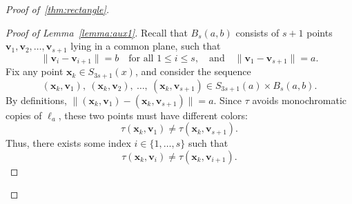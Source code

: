\documentclass[11pt]{article}
\theoremstyle{definition}
\begin{document}
\begin{proof}[Proof of~\cref{thm:rectangle}]
\begin{proof}[Proof of Lemma~\ref{lemma:aux1}]
Recall that \( B_s(a, b) \) consists of \(s + 1\) points \(\boldsymbol{v}_1, \boldsymbol{v}_2, \ldots, \boldsymbol{v}_{s+1}\) lying in a common plane, such that
    \[
        \|\boldsymbol{v}_i - \boldsymbol{v}_{i+1}\| = b \quad \text{for all } 1 \le i \le s, \quad \text{and} \quad \|\boldsymbol{v}_1 - \boldsymbol{v}_{s+1}\| = a.
    \]
Fix any point \(\boldsymbol{x}_k \in S_{3s+1}(x)\), and consider the sequence
\[
(\boldsymbol{x}_k, \boldsymbol{v}_1),\ (\boldsymbol{x}_k, \boldsymbol{v}_2),\ \ldots,\ (\boldsymbol{x}_k, \boldsymbol{v}_{s+1})\in S_{3s+1}(a)\times B_{s}(a,b).
\]
By definitions, \(\|(\boldsymbol{x}_k, \boldsymbol{v}_1) - (\boldsymbol{x}_k, \boldsymbol{v}_{s+1})\| = a\). Since \(\tau\) avoids monochromatic copies of \(\ell_a\), these two points must have different colors:
\[
\tau(\boldsymbol{x}_k, \boldsymbol{v}_1) \ne \tau(\boldsymbol{x}_k, \boldsymbol{v}_{s+1}).
\]
Thus, there exists some index \(i \in \{1, \dots, s\}\) such that
\[
\tau(\boldsymbol{x}_k, \boldsymbol{v}_i) \ne \tau(\boldsymbol{x}_k, \boldsymbol{v}_{i+1}).
\]


\end{proof}
\end{proof}
\end{document}

